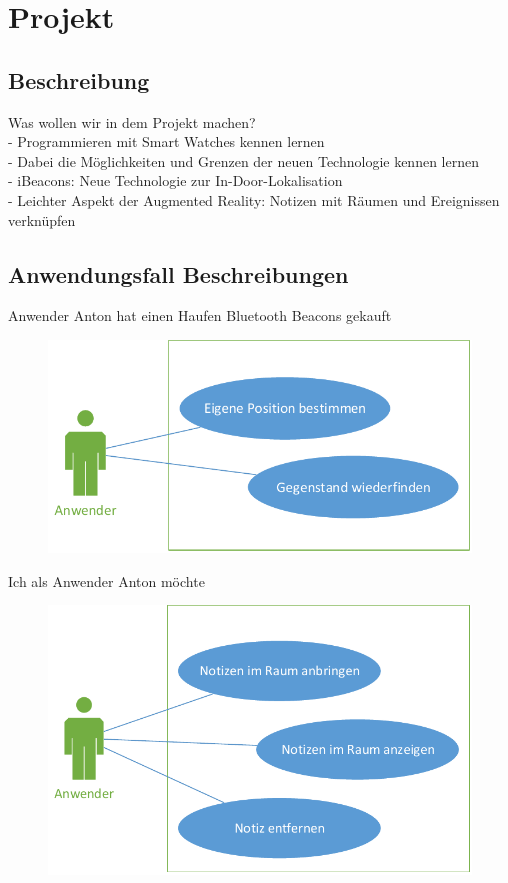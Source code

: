 



\setcounter{secnumdepth}{3}
\setcounter{tocdepth}{2}

\pagestyle{empty}


\tableofcontents
\setcounter{page}{1}

\pagestyle{scrheadings}

\newpage

\section{Projekt}

\subsection{Beschreibung}
Was wollen wir in dem Projekt machen?
\\- Programmieren mit Smart Watches kennen lernen
\\- Dabei die Möglichkeiten und Grenzen der neuen Technologie kennen lernen
\\- iBeacons: Neue Technologie zur In-Door-Lokalisation
\\- Leichter Aspekt der Augmented Reality: Notizen mit Räumen und Ereignissen verknüpfen

\subsection{Anwendungsfall Beschreibungen}
Anwender Anton hat einen Haufen Bluetooth Beacons gekauft 

\begin{figure}
\centering
\includegraphics[width=0.7\linewidth]{Bilder/UseCase-Position}
\caption{}
\label{fig:UseCase-Position}
\end{figure}

Ich als Anwender Anton möchte 

\begin{figure}
\centering
\includegraphics[width=0.7\linewidth]{Bilder/UseCase-Notizen}
\caption{}
\label{fig:UseCase-Notizen}
\end{figure}

